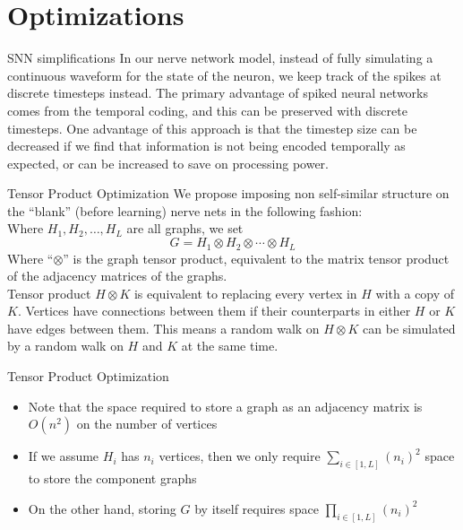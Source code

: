 \documentclass[leqno,presentation,unknownkeysallowed]{beamer}
\begin{document}
\section{Optimizations}

\begin{frame}{SNN simplifications}
In our nerve network model, instead of fully simulating a continuous waveform for the state of the neuron, we keep track of the spikes at discrete timesteps instead. The primary advantage of spiked neural networks comes from the temporal coding, and this can be preserved with discrete timesteps.\newline\newline
One advantage of this approach is that the timestep size can be decreased if we find that information is not being encoded temporally as expected, or can be increased to save on processing power.
\end{frame}

\begin{frame}{Tensor Product Optimization}
We propose imposing non self-similar structure on the ``blank'' (before learning) nerve nets in the following fashion:\\
Where $H_1, H_2, \ldots, H_L$ are all graphs, we set  
$$ G = H_1 \otimes H_2 \otimes \cdots \otimes H_L $$
Where ``$\otimes$'' is the graph tensor product, equivalent to the matrix tensor product of the adjacency matrices of the graphs.\\
Tensor product $H \otimes K$ is equivalent to replacing every vertex in $H$ with a copy of $K$. Vertices have connections between them if their counterparts in either $H$ or $K$ have edges between them. This means a random walk on $H \otimes K$ can be simulated by a random walk on $H$ and $K$ at the same time.
\end{frame}

\begin{frame}{Tensor Product Optimization}
\begin{itemize}
    \item Note that the space required to store a graph as an adjacency matrix is $O(n^2)$ on the number of vertices
    \item If we assume $H_i$ has $n_i$ vertices, then we only require $ \sum_{i \in [1,L]} (n_i)^2 $ space to store the component graphs
    \item On the other hand, storing $G$ by itself requires space $ \prod_{i \in [1,L]} (n_i)^2 $
\end{itemize}
\end{frame}
\end{document}
